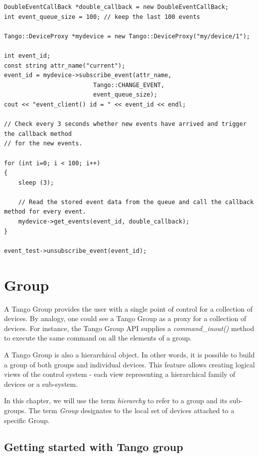 \begin{verbatim}
DoubleEventCallBack *double_callback = new DoubleEventCallBack;
int event_queue_size = 100; // keep the last 100 events
      
Tango::DeviceProxy *mydevice = new Tango::DeviceProxy("my/device/1");
 
int event_id;
const string attr_name("current");
event_id = mydevice->subscribe_event(attr_name, 
                         Tango::CHANGE_EVENT,
                         event_queue_size);
cout << "event_client() id = " << event_id << endl;

// Check every 3 seconds whether new events have arrived and trigger the callback method 
// for the new events.

for (int i=0; i < 100; i++)
{
    sleep (3); 
    
    // Read the stored event data from the queue and call the callback method for every event.
    mydevice->get_events(event_id, double_callback);
}
 
event_test->unsubscribe_event(event_id);
\end{verbatim}



\section{Group}

A Tango Group provides the user with a single point of control for
a collection of devices. By analogy, one could see a Tango Group as
a proxy for a collection of devices. For instance, the Tango Group
API supplies a \emph{command\_inout()} method to execute the same
command on all the elements of a group. 

A Tango Group is also a hierarchical object. In other words, it is
possible to build a group of both groups and individual devices. This
feature allows creating logical views of the control system - each
view representing a hierarchical family of devices or a sub-system. 

In this chapter, we will use the term \emph{hierarchy} to refer to
a group and its sub-groups. The term \emph{Group} designates to the
local set of devices attached to a specific Group. 


\subsection{Getting started with Tango group}

